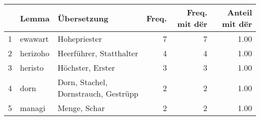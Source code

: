 \begin{tabular}{rllrrr}
  \hline
 & Lemma & Übersetzung & Freq. & Freq. mit dër & Anteil mit dër \\ 
  \hline
1 & ewawart & Hohepriester &   7 &   7 & 1.00 \\ 
  2 & herizoho & Heerführer, Statthalter &   4 &   4 & 1.00 \\ 
  3 & heristo & Höchster, Erster &   3 &   3 & 1.00 \\ 
  4 & dorn & Dorn, Stachel, Dornstrauch, Gestrüpp &   2 &   2 & 1.00 \\ 
  5 & managi & Menge, Schar &   2 &   2 & 1.00 \\ 
   \hline
\end{tabular}
